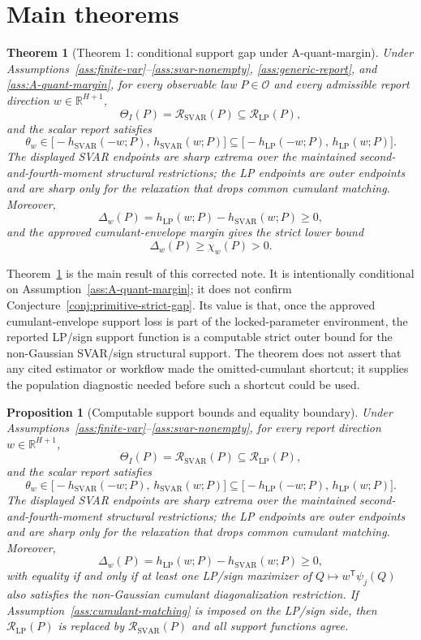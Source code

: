 \documentclass[11pt]{article}
\newcommand{\transpose}{\mathsf{T}}
\newcommand{\R}{\mathbb{R}}
\theoremstyle{definition}
\theoremstyle{plain}
\newtheorem{theorem}{Theorem}
\newtheorem{proposition}{Proposition}
\theoremstyle{remark}
\begin{document}
\section{Main theorems}
\begin{theorem}[Theorem 1: conditional support gap under A-quant-margin]\label{thm:conditional-margin}
Under Assumptions~\ref{ass:finite-var}--\ref{ass:svar-nonempty},
\ref{ass:generic-report}, and \ref{ass:A-quant-margin}, for every observable
law \(P\in\mathcal O\) and every admissible report direction
\(w\in\R^{H+1}\),
\[
\Theta_I(P)=\mathcal R_{\mathrm{SVAR}}(P)
\subseteq \mathcal R_{\mathrm{LP}}(P),
\]
and the scalar report satisfies
\[
\theta_w\in
\bigl[-h_{\mathrm{SVAR}}(-w;P),\,h_{\mathrm{SVAR}}(w;P)\bigr]
\subseteq
\bigl[-h_{\mathrm{LP}}(-w;P),\,h_{\mathrm{LP}}(w;P)\bigr].
\]
The displayed SVAR endpoints are sharp extrema over the maintained
second-and-fourth-moment structural restrictions; the LP endpoints are outer
endpoints and are sharp only for the relaxation that drops common cumulant
matching.  Moreover,
\[
\Delta_w(P)=h_{\mathrm{LP}}(w;P)-h_{\mathrm{SVAR}}(w;P)\ge0,
\]
and the approved cumulant-envelope margin gives the strict lower bound
\[
\Delta_w(P)\ge \chi_w(P)>0.
\]
\end{theorem}

Theorem~\ref{thm:conditional-margin} is the main result of this corrected
note.  It is intentionally conditional on
Assumption~\ref{ass:A-quant-margin}; it does not confirm
Conjecture~\ref{conj:primitive-strict-gap}.  Its value is that, once the
approved cumulant-envelope support loss is part of the locked-parameter
environment, the reported LP/sign support function is a computable strict
outer bound for the non-Gaussian SVAR/sign structural support.  The theorem
does not assert that any cited estimator or workflow made the omitted-cumulant
shortcut; it supplies the population diagnostic needed before such a shortcut
could be used.

\begin{proposition}[Computable support bounds and equality boundary]\label{prop:support-boundary}
Under Assumptions~\ref{ass:finite-var}--\ref{ass:svar-nonempty}, for every
report direction \(w\in\R^{H+1}\),
\[
\Theta_I(P)=\mathcal R_{\mathrm{SVAR}}(P)
\subseteq \mathcal R_{\mathrm{LP}}(P),
\]
and the scalar report satisfies
\[
\theta_w\in
\bigl[-h_{\mathrm{SVAR}}(-w;P),\,h_{\mathrm{SVAR}}(w;P)\bigr]
\subseteq
\bigl[-h_{\mathrm{LP}}(-w;P),\,h_{\mathrm{LP}}(w;P)\bigr].
\]
The displayed SVAR endpoints are sharp extrema over the maintained
second-and-fourth-moment structural restrictions; the LP endpoints are outer
endpoints and are sharp only for the relaxation that drops common cumulant
matching.  Moreover,
\[
\Delta_w(P)=h_{\mathrm{LP}}(w;P)-h_{\mathrm{SVAR}}(w;P)\ge0,
\]
with equality if and only if at least one LP/sign maximizer of
\(Q\mapsto w^\transpose\psi_j(Q)\) also satisfies the non-Gaussian cumulant
diagonalization restriction.  If Assumption~\ref{ass:cumulant-matching} is
imposed on the LP/sign side, then \(\mathcal R_{\mathrm{LP}}(P)\) is replaced
by \(\mathcal R_{\mathrm{SVAR}}(P)\) and all support functions agree.
\end{proposition}
\end{document}
